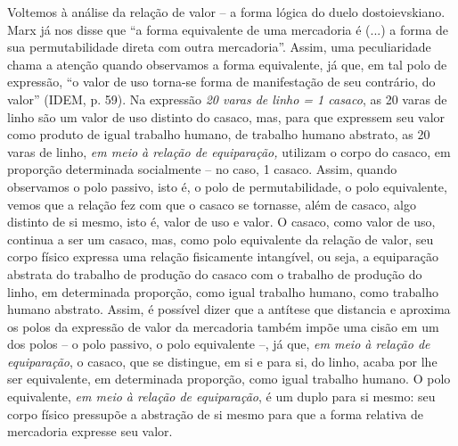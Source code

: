 Voltemos à análise da relação de valor -- a forma lógica do duelo
dostoievskiano. Marx já nos disse que ``a forma equivalente de uma
mercadoria é (...) a forma de sua permutabilidade direta com outra
mercadoria''. Assim, uma peculiaridade chama a atenção quando observamos
a forma equivalente, já que, em tal polo de expressão, ``o valor de uso
torna-se forma de manifestação de seu contrário, do valor'' (IDEM, p.
59). Na expressão \emph{20 varas de linho = 1 casaco}, as 20 varas de
linho são um valor de uso distinto do casaco, mas, para que expressem
seu valor como produto de igual trabalho humano, de trabalho humano
abstrato, as 20 varas de linho, \emph{em meio à relação de equiparação,}
utilizam o corpo do casaco, em proporção determinada socialmente -- no
caso, 1 casaco. Assim, quando observamos o polo passivo, isto é, o polo
de permutabilidade, o polo equivalente, vemos que a relação fez com que
o casaco se tornasse, além de casaco, algo distinto de si mesmo, isto é,
valor de uso e valor. O casaco, como valor de uso, continua a ser um
casaco, mas, como polo equivalente da relação de valor, seu corpo físico
expressa uma relação fisicamente intangível, ou seja, a equiparação
abstrata do trabalho de produção do casaco com o trabalho de produção do
linho, em determinada proporção, como igual trabalho humano, como
trabalho humano abstrato. Assim, é possível dizer que a antítese que
distancia e aproxima os polos da expressão de valor da mercadoria também
impõe uma cisão em um dos polos -- o polo passivo, o polo equivalente
--, já que, \emph{em meio à relação de equiparação}, o casaco, que se
distingue, em si e para si, do linho, acaba por lhe ser equivalente, em
determinada proporção, como igual trabalho humano. O polo equivalente,
\emph{em meio à relação de equiparação}, é um duplo para si mesmo: seu
corpo físico pressupõe a abstração de si mesmo para que a forma relativa
de mercadoria expresse seu valor.

